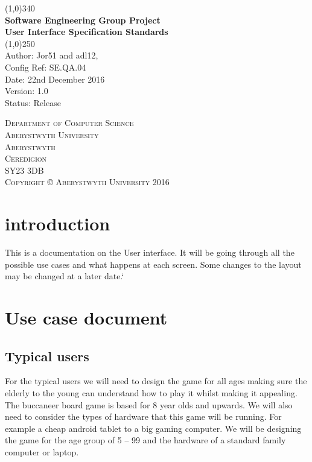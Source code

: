 \documentclass{article}
\begin{document}
	\begin{titlepage}
		\begin{center}
		\line(1,0){340}\\ 
		[0.25in]
		\large{\bfseries Software Engineering Group Project} \\
		\large {\bfseries User Interface Specification Standards}\\
		[2.5mm]
		 \line(1,0){250}\\
		 [0.25in]
		 \textsf {Author: Jor51 and adl12, \\
		 Config Ref: SE.QA.04  \\
		 Date: 22nd December 2016  \\
		 Version: 1.0  \\
		 Status: Release} \\
		 [10.0cm]
		\end{center}
		
		\begin{flushright}
		\textsc {\small Department of Computer Science  \\
		Aberystwyth University  \\
		Aberystwyth  \\
		Ceredigion  \\
		SY23 3DB  \\ 
		Copyright © Aberystwyth University 2016}
		\end{flushright}
	\end{titlepage}
	
	\tableofcontents
	\thispagestyle{empty}
	\cleardoublepage	
	\setcounter{page}{1}
	
	\section{introduction} \label{sec:intro}
	This is a documentation on the User interface. It will be going through all the possible use cases and what happens at each screen. Some changes to the layout may be changed at a later date.`
	
	\section{Use case document} \label{sec:usercase}
	\subsection{Typical users}
	For the typical users we will need to design the game for all ages making sure the elderly to the young can understand how to play it whilst making it appealing. The buccaneer board game is based for 8 year olds and upwards. We will also need to consider the types of hardware that this game will be running. For example a cheap android tablet to a big gaming computer. We will be designing the game for the age group of 5 – 99 and the hardware of a standard family computer or laptop.
	
\end{document}
